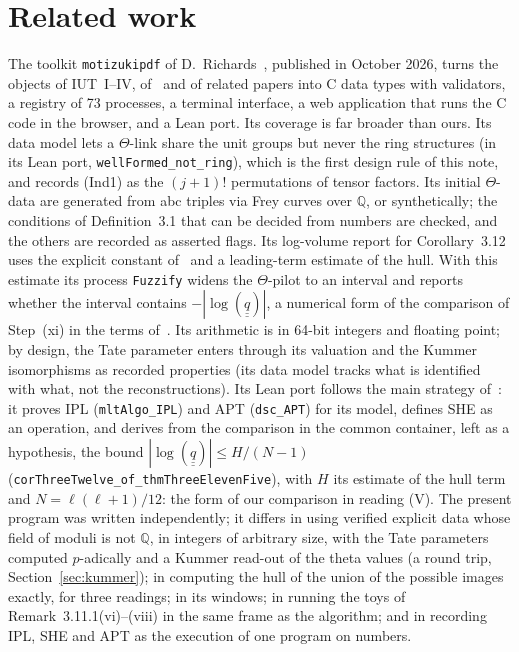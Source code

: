 \documentclass[11pt,a4paper]{article}
\newcommand{\qq}{\underline{\underline{q}}{}}
\newcommand{\Q}{\mathbb{Q}}
\begin{document}
\section{Related work}\label{sec:related}
The toolkit \texttt{motizukipdf} of D.~Richards~\cite{Richards}, published in October 2026, turns the objects of
IUT~I--IV, of~\cite{EssLgc} and of related papers into C data types with validators, a registry of 73 processes, a
terminal interface, a web application that runs the C code in the browser, and a Lean port. Its coverage is far broader
than ours. Its data model lets a $\Theta$-link share the unit groups but never the ring structures (in its Lean port,
\nolinkurl{wellFormed_not_ring}), which is the first design rule of this note, and records (Ind1) as the $(j+1)!$
permutations of tensor factors. Its initial $\Theta$-data are generated from abc triples via Frey curves over $\Q$, or
synthetically; the conditions of Definition~3.1 that can be decided from numbers are checked, and the others are
recorded as asserted flags. Its log-volume report for Corollary~3.12 uses the explicit constant
of~\cite[Thm.~1.10]{IUT4} and a leading-term estimate of the hull. With this estimate its process \texttt{Fuzzify}
widens the $\Theta$-pilot to an interval and reports whether the interval contains $-|\log(\qq)|$, a numerical form of
the comparison of Step~(xi) in the terms of~\cite[\S3.10]{EssLgc}. Its arithmetic is in 64-bit integers and floating
point; by design, the Tate parameter enters through its valuation and the Kummer isomorphisms as recorded properties
(its data model tracks what is identified with what, not the reconstructions). Its Lean port follows the main strategy of~\cite{Formal}: it proves IPL
(\nolinkurl{mltAlgo_IPL}) and APT (\nolinkurl{dsc_APT}) for its model, defines SHE as an operation, and derives from
the comparison in the common container, left as a hypothesis, the bound $|\log(\qq)|\le H/(N-1)$
(\nolinkurl{corThreeTwelve_of_thmThreeElevenFive}), with $H$ its estimate of the hull term and $N=\ell(\ell+1)/12$:
the form of our comparison in reading (V). The present program was
written independently; it differs in using verified explicit data whose field of moduli is not $\Q$, in integers of
arbitrary size, with the Tate parameters computed $p$-adically and a Kummer read-out of the theta values (a round
trip, Section~\ref{sec:kummer}); in computing the hull of the union of the possible images exactly, for three
readings; in its windows; in running the toys of Remark~3.11.1(vi)--(viii) in the same frame as the algorithm; and in
recording IPL, SHE and APT as the execution of one program on numbers.
\end{document}
